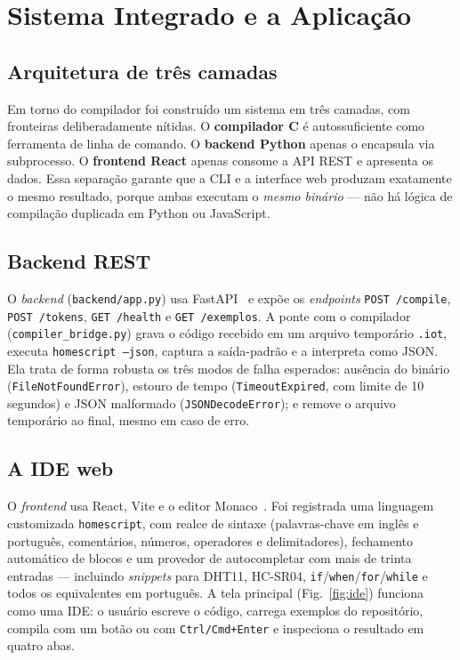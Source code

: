 \documentclass[conference]{IEEEtran}
\begin{document}
\section{Sistema Integrado e a Aplicação}
\label{sec:sistema}

\subsection{Arquitetura de três camadas}

Em torno do compilador foi construído um sistema em três camadas, com
fronteiras deliberadamente nítidas. O \textbf{compilador C} é
autossuficiente como ferramenta de linha de comando. O \textbf{backend
Python} apenas o encapsula via subprocesso. O \textbf{frontend React}
apenas consome a API REST e apresenta os dados. Essa separação garante que
a CLI e a interface web produzam exatamente o mesmo resultado, porque ambas
executam o \emph{mesmo binário} --- não há lógica de compilação duplicada
em Python ou JavaScript.

\subsection{Backend REST}

O \emph{backend} (\texttt{backend/app.py}) usa FastAPI~\cite{fastapi2024} e
expõe os \emph{endpoints} \texttt{POST /compile}, \texttt{POST /tokens},
\texttt{GET /health} e \texttt{GET /exemplos}. A ponte com o compilador
(\texttt{compiler\_bridge.py}) grava o código recebido em um arquivo
temporário \texttt{.iot}, executa \texttt{homescript --json}, captura a
saída-padrão e a interpreta como JSON. Ela trata de forma robusta os três
modos de falha esperados: ausência do binário (\texttt{FileNotFoundError}),
estouro de tempo (\texttt{TimeoutExpired}, com limite de 10 segundos) e
JSON malformado (\texttt{JSONDecodeError}); e remove o arquivo temporário
ao final, mesmo em caso de erro.

\subsection{A IDE web}

O \emph{frontend} usa React, Vite e o editor Monaco~\cite{react2024,monaco2024}.
Foi registrada uma linguagem customizada \texttt{homescript}, com
realce de sintaxe (palavras-chave em inglês e português, comentários,
números, operadores e delimitadores), fechamento automático de blocos e um
provedor de autocompletar com mais de trinta entradas --- incluindo
\emph{snippets} para DHT11, HC-SR04, \texttt{if}/\texttt{when}/\texttt{for}/\texttt{while}
e todos os equivalentes em português. A tela principal (Fig.~\ref{fig:ide})
funciona como uma IDE: o usuário escreve o código, carrega exemplos do
repositório, compila com um botão ou com \texttt{Ctrl/Cmd+Enter} e
inspeciona o resultado em quatro abas.
\end{document}
